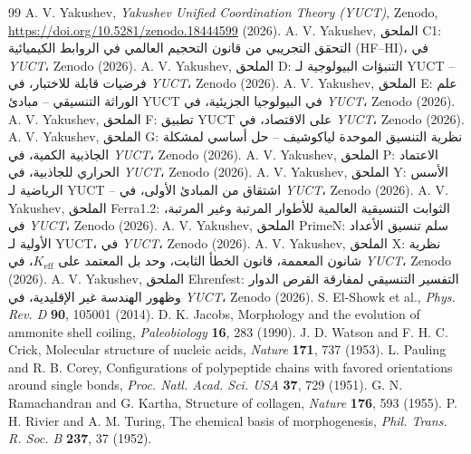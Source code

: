 \documentclass[11pt,a4paper]{article}
\newcommand{\ar}[1]{\foreignlanguage{arabic}{#1}}
\begin{document}
	\begin{thebibliography}{99}
		A. V. Yakushev, \emph{Yakushev Unified Coordination Theory (YUCT)}, Zenodo, \url{https://doi.org/10.5281/zenodo.18444599} (2026).
		A. V. Yakushev, \ar{الملحق C1: التحقق التجريبي من قانون التحجيم العالمي في الروابط الكيميائية (HF–HI)، في} \emph{YUCT}، Zenodo (2026).
		A. V. Yakushev, \ar{الملحق D: التنبؤات البيولوجية لـ YUCT – فرضيات قابلة للاختبار، في} \emph{YUCT}، Zenodo (2026).
		A. V. Yakushev, \ar{الملحق E: علم الوراثة التنسيقي – مبادئ YUCT في البيولوجيا الجزيئية، في} \emph{YUCT}، Zenodo (2026).
		A. V. Yakushev, \ar{الملحق F: تطبيق YUCT على الاقتصاد، في} \emph{YUCT}، Zenodo (2026).
		A. V. Yakushev, \ar{الملحق G: نظرية التنسيق الموحدة لياكوشيف – حل أساسي لمشكلة الجاذبية الكمية، في} \emph{YUCT}، Zenodo (2026).
		A. V. Yakushev, \ar{الملحق P: الاعتماد الحراري للجاذبية، في} \emph{YUCT}، Zenodo (2026).
		A. V. Yakushev, \ar{الملحق Y: الأسس الرياضية لـ YUCT – اشتقاق من المبادئ الأولى، في} \emph{YUCT}، Zenodo (2026).
		A. V. Yakushev, \ar{الملحق Ferra1.2: الثوابت التنسيقية العالمية للأطوار المرتبة وغير المرتبة، في} \emph{YUCT}، Zenodo (2026).
		A. V. Yakushev, \ar{الملحق PrimeN: سلم تنسيق الأعداد الأولية لـ YUCT، في} \emph{YUCT}، Zenodo (2026).
		A. V. Yakushev, \ar{الملحق X: نظرية شانون المعممة، قانون الخطأ الثابت، وحد بل المعتمد على \(K_{\mathrm{eff}}\)، في} \emph{YUCT}، Zenodo (2026).
		A. V. Yakushev, \ar{الملحق Ehrenfest: التفسير التنسيقي لمفارقة القرص الدوار وظهور الهندسة غير الإقليدية، في} \emph{YUCT}، Zenodo (2026).
		S. El-Showk et al., \emph{Phys. Rev. D} \textbf{90}, 105001 (2014).
		D. K. Jacobs, Morphology and the evolution of ammonite shell coiling, \emph{Paleobiology} \textbf{16}, 283 (1990).
		J. D. Watson and F. H. C. Crick, Molecular structure of nucleic acids, \emph{Nature} \textbf{171}, 737 (1953).
		L. Pauling and R. B. Corey, Configurations of polypeptide chains with favored orientations around single bonds, \emph{Proc. Natl. Acad. Sci. USA} \textbf{37}, 729 (1951).
		G. N. Ramachandran and G. Kartha, Structure of collagen, \emph{Nature} \textbf{176}, 593 (1955).
		P. H. Rivier and A. M. Turing, The chemical basis of morphogenesis, \emph{Phil. Trans. R. Soc. B} \textbf{237}, 37 (1952).

\end{thebibliography}
\end{document}
